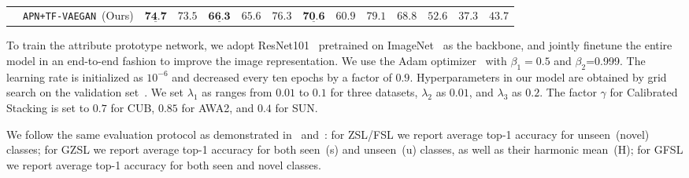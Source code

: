 \begin{table*}[t]
{\begin{tabular}{ll| x{1.2cm} x{1.2cm} x{1.2cm} |c c c |c c c |c c c}
     &\texttt{APN+TF-VAEGAN}~(Ours) &  $\underline{\textbf{74.7}}$ & $73.5$ & $\underline{\textbf{66.3}}$&  $65.6$ & $76.3$ & $\underline{\textbf{70.6}}$&  $60.9$ & $79.1$ & $68.8$&  $52.6$ & $37.3$ & $43.7$ \\
\end{tabular}
}
\caption{ }
\label{tab:ZSL_acc}
\end{table*}

To train the attribute prototype network, we adopt ResNet101~\citep{he2016deep} pretrained on ImageNet~\citep{39_Imagenet} as the backbone, and jointly finetune the entire model in an end-to-end fashion to improve the image representation.
We use the Adam optimizer~\citep{kingma2014adam} with $\beta_1=0.5$ and $\beta_2$=0.999. The learning rate is initialized as $10^{-6}$ and decreased every ten epochs by a factor of $0.9$. Hyperparameters in our model are obtained by grid search on the validation set~\citep{xian2018zero}. We set $\lambda_1$ as ranges from $0.01$ to $0.1$ for three datasets, $\lambda_2$ as $0.01$, and $\lambda_3$ as $0.2$.
The factor $\gamma$ for Calibrated Stacking is set to $0.7$ for CUB, $0.85$ for AWA2, and $0.4$ for SUN.

We follow the same evaluation protocol as demonstrated in~\citet{xian2018zero} and~\citet{xian2019}: for ZSL/FSL we report average top-1 accuracy for unseen~(novel) classes; for GZSL we report average top-1 accuracy for both seen~(s) and unseen~(u) classes, as well as their harmonic mean~(H); for GFSL we report average top-1 accuracy for both seen and novel classes.





